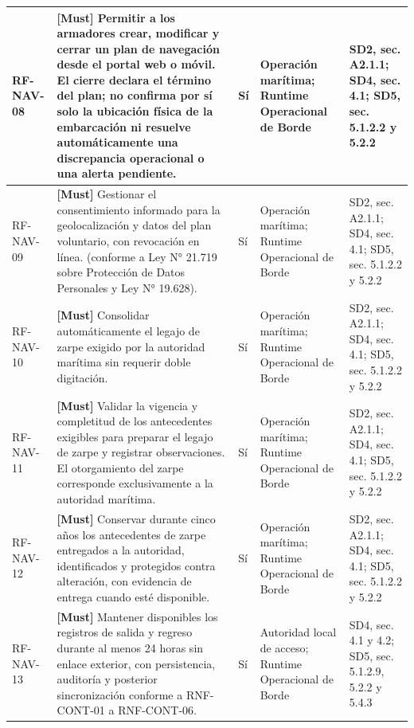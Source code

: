 \begin{paginaHorizontalSynaptix}
\begin{longtable}{|L{0.09\AnchoMatrizTDoce}|L{0.385\AnchoMatrizTDoce}|L{0.065\AnchoMatrizTDoce}|L{0.18\AnchoMatrizTDoce}|L{0.28\AnchoMatrizTDoce}|}
RF-\allowbreak{}NAV-\allowbreak{}08 &
\textbf{[Must]} Permitir a los armadores crear, modificar y cerrar un plan de navegación desde el portal web o móvil. El cierre declara el término del plan; no confirma por sí solo la ubicación física de la embarcación ni resuelve automáticamente una discrepancia operacional o una alerta pendiente. &
Sí &
Operación marítima; Runtime Operacional de Borde &
SD2, sec. A2.1.1; SD4, sec. 4.1; SD5, sec. 5.1.2.2 y 5.2.2 \\ \hline

RF-\allowbreak{}NAV-\allowbreak{}09 &
\textbf{[Must]} Gestionar el consentimiento informado para la geolocalización y datos del plan voluntario, con revocación en línea. (conforme a Ley N° 21.719 sobre Protección de Datos Personales y Ley N° 19.628). &
Sí &
Operación marítima; Runtime Operacional de Borde &
SD2, sec. A2.1.1; SD4, sec. 4.1; SD5, sec. 5.1.2.2 y 5.2.2 \\ \hline

RF-\allowbreak{}NAV-\allowbreak{}10 &
\textbf{[Must]} Consolidar automáticamente el legajo de zarpe exigido por la autoridad marítima sin requerir doble digitación. &
Sí &
Operación marítima; Runtime Operacional de Borde &
SD2, sec. A2.1.1; SD4, sec. 4.1; SD5, sec. 5.1.2.2 y 5.2.2 \\ \hline

RF-\allowbreak{}NAV-\allowbreak{}11 &
\textbf{[Must]} Validar la vigencia y completitud de los antecedentes exigibles para preparar el legajo de zarpe y registrar observaciones. El otorgamiento del zarpe corresponde exclusivamente a la autoridad marítima. &
Sí &
Operación marítima; Runtime Operacional de Borde &
SD2, sec. A2.1.1; SD4, sec. 4.1; SD5, sec. 5.1.2.2 y 5.2.2 \\ \hline

RF-\allowbreak{}NAV-\allowbreak{}12 &
\textbf{[Must]} Conservar durante cinco años los antecedentes de zarpe entregados a la autoridad, identificados y protegidos contra alteración, con evidencia de entrega cuando esté disponible. &
Sí &
Operación marítima; Runtime Operacional de Borde &
SD2, sec. A2.1.1; SD4, sec. 4.1; SD5, sec. 5.1.2.2 y 5.2.2 \\ \hline

RF-\allowbreak{}NAV-\allowbreak{}13 &
\textbf{[Must]} Mantener disponibles los registros de salida y regreso durante al menos 24 horas sin enlace exterior, con persistencia, auditoría y posterior sincronización conforme a RNF-CONT-01 a RNF-CONT-06. &
Sí &
Autoridad local de acceso; Runtime Operacional de Borde &
SD4, sec. 4.1 y 4.2; SD5, sec. 5.1.2.9, 5.2.2 y 5.4.3 \\ \hline
\end{longtable}



\end{paginaHorizontalSynaptix}
